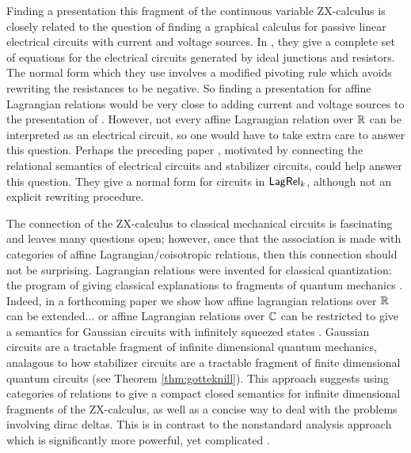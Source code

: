 Finding a presentation this fragment of the  continuous variable ZX-calculus is closely related to the question of finding a graphical calculus for passive linear electrical circuits with current and voltage sources.  In \cite{amolak}, they give a complete set of equations for the electrical circuits generated by ideal junctions and resistors.  The normal form which they use involves a modified pivoting rule which avoids rewriting the resistances to be negative.  
  So finding a presentation for affine Lagrangian relations would be very close to adding current and voltage sources to the presentation of \cite{amolak}. However, not every affine Lagrangian relation over $\mathbb{R}$ can be interpreted as an electrical circuit, so one would have to take extra care to answer this question. Perhaps the preceding paper \cite{kirch}, motivated by connecting the relational semantics of electrical circuits and stabilizer circuits, could help answer this question. They give a normal form for circuits in $\mathsf{Lag}\mathsf{Rel}_k$, although not an explicit rewriting procedure.

The connection of the ZX-calculus to classical mechanical circuits is fascinating and leaves many questions open; however, once that the association is made with categories of affine Lagrangian/coisotropic relations, then this connection should not be surprising.  Lagrangian relations were invented for classical quantization: the program of giving classical explanations to fragments of quantum mechanics \cite{guillemin2013semi}.
Indeed, in a forthcoming paper we show how affine lagrangian relations over $\mathbb{R}$ can be extended... or affine Lagrangian relations over $\mathbb{C}$ can be restricted to give a semantics for Gaussian circuits with infinitely squeezed states \cite{ribtccci}.  Gaussian circuits are a tractable fragment of infinite dimensional quantum mechanics, analagous to how stabilizer circuits are a tractable fragment of finite dimensional quantum circuits (see Theorem \ref{thm:gotteknill}).  This approach suggests using categories of relations to give a compact closed semantics for infinite dimensional fragments of the ZX-calculus, as well as a concise way to deal with the problems involving dirac deltas.  This is in contrast to the nonstandard analysis approach which is significantly more powerful, yet complicated  \cite{Gogioso2017}.



